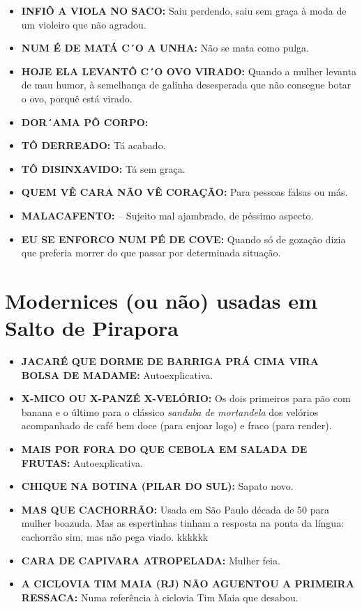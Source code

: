 \documentclass[12pt,brazil,]{book}
\providecommand{\tightlist}{%
  \setlength{\itemsep}{0pt}\setlength{\parskip}{0pt}}
\begin{document}
\begin{itemize}
\item
  \textbf{INFIÔ A VIOLA NO SACO:} Saiu perdendo, saiu sem graça à moda
  de um violeiro que não agradou.\\
\item
  \textbf{NUM É DE MATÁ C´O A UNHA:} Não se mata como pulga.\\
\item
  \textbf{HOJE ELA LEVANTÔ C´O OVO VIRADO:} Quando a mulher levanta de
  mau humor, à semelhança de galinha desesperada que não consegue botar
  o ovo, porquê está virado.\\
\item
  \textbf{DOR´AMA PÔ CORPO:}\\
\item
  \textbf{TÔ DERREADO:} Tá acabado.\\
\item
  \textbf{TÔ DISINXAVIDO:} Tá sem graça.\\
\item
  \textbf{QUEM VÊ CARA NÃO VÊ CORAÇÃO:} Para pessoas falsas ou más.
\item
  \textbf{MALACAFENTO:} -- Sujeito mal ajambrado, de péssimo aspecto.
\item
  \textbf{EU SE ENFORCO NUM PÉ DE COVE:} Quando só de gozação dizia que
  preferia morrer do que passar por determinada situação.
\end{itemize}

\section{Modernices (ou não) usadas em Salto de
Pirapora}\label{modernices-ou-nuxe3o-usadas-em-salto-de-pirapora}

\begin{itemize}
\tightlist
\item
  \textbf{JACARÉ QUE DORME DE BARRIGA PRÁ CIMA VIRA BOLSA DE MADAME:}
  Autoexplicativa.\\
\item
  \textbf{X-MICO OU X-PANZÉ X-VELÓRIO:} Os dois primeiros para pão com
  banana e o último para o clássico \emph{sanduba de mortandela} dos
  velórios acompanhado de café bem doce (para enjoar logo) e fraco (para
  render).\\
\item
  \textbf{MAIS POR FORA DO QUE CEBOLA EM SALADA DE FRUTAS:}
  Autoexplicativa.\\
\item
  \textbf{CHIQUE NA BOTINA (PILAR DO SUL):} Sapato novo.\\
\item
  \textbf{MAS QUE CACHORRÃO:} Usada em São Paulo década de 50 para
  mulher boazuda. Mas as espertinhas tinham a resposta na ponta da
  língua: cachorrão sim, mas não pega viado. kkkkkk\\
\item
  \textbf{CARA DE CAPIVARA ATROPELADA:} Mulher feia.\\
\item
  \textbf{A CICLOVIA TIM MAIA (RJ) NÃO AGUENTOU A PRIMEIRA RESSACA:}
  Numa referência à ciclovia Tim Maia que desabou.
\end{itemize}
\end{document}
